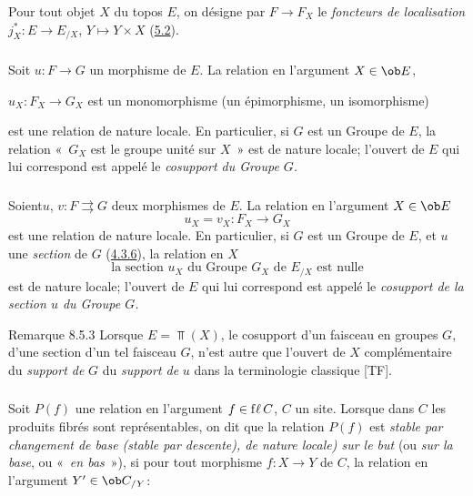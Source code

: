 Pour tout objet $X$ du topos $E$, on désigne par $F\rightarrow F_X$
le \emph{foncteurs de localisation} $j^{\ast}_X:E\rightarrow
E_{/X}$, $Y\mapsto Y\times X$ (\hyperref[IV.subsec5.2]{5.2}).

\subsubsection{}
Soit $u:F\rightarrow G$ un morphisme de $E$. La relation en
l'argument $X\in \ob E$,

$u_X:F_X\rightarrow G_X$ est un monomorphisme (\resp un
épimorphisme, \resp un isomorphisme)

\noindent est une relation de nature locale. En particulier, si $G$
est un Groupe de $E$, la relation « $G_X$ est le groupe unité sur
$X$ » est de nature locale; l'ouvert de $E$ qui lui correspond est
appelé le \emph{cosupport du Groupe $G$.}

\subsubsection{}
Soient\pageoriginale $u$, $v:F\rightrightarrows G$ deux morphismes
de $E$. La relation en l'argument $X\in \ob E$
$$
u_X=v_X:F_X\longrightarrow G_X
$$
est une relation de nature locale. En particulier, si $G$ est un
Groupe de $E$, et $u$ une \emph{section} de $G$
(\hyperref[IV.subsubsec4.3.6]{4.3.6}), la relation en $X$
$$
\mbox{la section $u_X$ du Groupe $G_X$ de $E_{/X}$ est nulle}
$$
est de nature locale; l'ouvert de $E$ qui lui correspond est appelé
le \emph{cosupport de la section $u$ du Groupe $G$.}

\begin{enonce*}[remark]{Remarque 8.5.3}
Lorsque $E=\Top(X)$, le cosupport d'un faisceau en groupes $G$,
\resp d'une section d'un tel faisceau $G$, n'est autre que l'ouvert
de $X$ complémentaire du \emph{support de} $G$ \resp du
\emph{support de} $u$ dans la terminologie classique [TF].
\end{enonce*}

\setcounter{subsubsection}{3}
\subsubsection{}
Soit $P(f)$ une relation en l'argument $f\in {\rm f\ell\,} C$, $C$
un site. Lorsque dans $C$ les produits fibrés sont représentables,
on dit que la relation $P(f)$ est \emph{stable par changement de
base (\resp stable par descente), \resp de nature locale) sur le
but} (ou \emph{sur la base}, ou « \emph{en bas} »), si pour tout
morphisme $f:X\rightarrow Y$ de $C$, la relation en l'argument
$Y'\in \ob C_{/Y}$:

